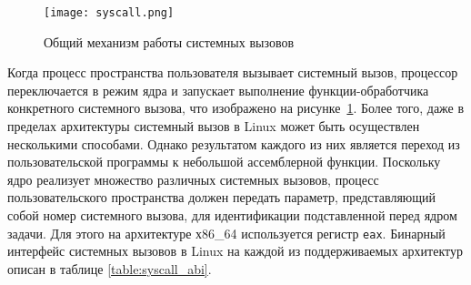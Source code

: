 \begin{figure}
  \centering
  \texttt{[image: syscall.png]}
  \caption{Общий механизм работы системных вызовов}
  \label{fig:syscall}
\end{figure}

Когда процесс пространства пользователя вызывает системный вызов, процессор
переключается в режим ядра и запускает выполнение функции-обработчика
конкретного системного вызова, что изображено на рисунке~\ref{fig:syscall}.
Более того, даже в пределах архитектуры системный вызов в Linux может быть
осуществлен несколькими способами. Однако результатом каждого из них является
переход из пользовательской программы к небольшой ассемблерной функции.
Поскольку ядро реализует множество различных системных вызовов, процесс
пользовательского пространства должен передать параметр, представляющий собой
номер системного вызова, для идентификации подставленной перед ядром задачи. Для
этого на архитектуре х86\_64 используется регистр \texttt{eax}. Бинарный
интерфейс системных вызовов в Linux на каждой из поддерживаемых архитектур
описан в таблице \ref{table:syscall_abi}.

